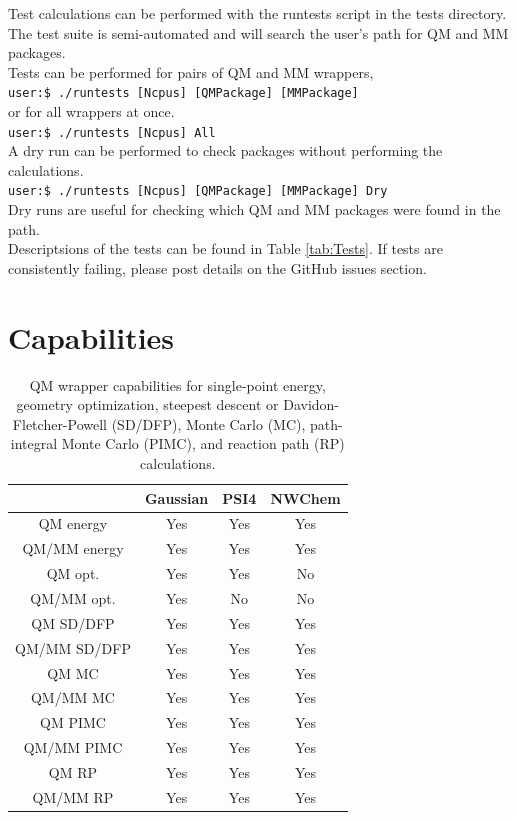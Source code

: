 \documentclass[12pt]{report}
\begin{document}
Test calculations can be performed with the runtests script in the tests
directory.
The test suite is semi-automated and will search the user's path for QM and
MM packages. \\

Tests can be performed for pairs of QM and MM wrappers, \\

\texttt{user:\$ ./runtests [Ncpus] [QMPackage] [MMPackage]} \\

or for all wrappers at once. \\

\texttt{user:\$ ./runtests [Ncpus] All} \\

A dry run can be performed to check packages without performing the
calculations. \\

\texttt{user:\$ ./runtests [Ncpus] [QMPackage] [MMPackage] Dry} \\

Dry runs are useful for checking which QM and MM packages were found in the
path. \\

Descriptsions of the tests can be found in Table \ref{tab:Tests}.
If tests are consistently failing, please post details on the GitHub issues
section.

\section{Capabilities}

\begin{table}[hbt]
 \centering
 \begin{tabular}{|c|c c c|}
 \hline
  & Gaussian & PSI4 & NWChem \\ \hline
 QM energy & Yes & Yes & Yes \\
 QM/MM energy & Yes & Yes & Yes \\ \hline
 QM opt. & Yes & Yes & No \\
 QM/MM opt. & Yes & No & No \\ \hline
 QM SD/DFP & Yes & Yes & Yes \\
 QM/MM SD/DFP & Yes & Yes & Yes \\ \hline
 QM MC & Yes & Yes & Yes \\
 QM/MM MC & Yes & Yes & Yes \\ \hline
 QM PIMC & Yes & Yes & Yes \\
 QM/MM PIMC & Yes & Yes & Yes \\ \hline
 QM RP & Yes & Yes & Yes \\
 QM/MM RP & Yes & Yes & Yes \\ \hline
 \end{tabular}
 \caption{
 QM wrapper capabilities for single-point energy, geometry optimization,
 steepest descent or Davidon-Fletcher-Powell (SD/DFP), Monte Carlo (MC),
 path-integral Monte Carlo (PIMC), and reaction path (RP) calculations.}
 \label{tab:QMWrapCap}
\end{table}
\end{document}
